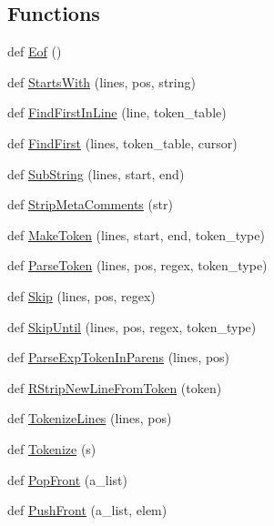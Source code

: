 \subsection*{Functions}
\begin{DoxyCompactItemize}
\item 
def \hyperlink{namespacepump_a38844b22bd5a51c098b07c2c36c5c5b3}{Eof} ()
\item 
def \hyperlink{namespacepump_a9353db466a97e632058887a77c3b26aa}{Starts\+With} (lines, pos, string)
\item 
def \hyperlink{namespacepump_af9f92ec64fe45399c7e051115a107ee7}{Find\+First\+In\+Line} (line, token\+\_\+table)
\item 
def \hyperlink{namespacepump_a08f2d05c192d11a134c008287bafef07}{Find\+First} (lines, token\+\_\+table, cursor)
\item 
def \hyperlink{namespacepump_a859edb180cfc24c24fabcfb4f2bedf9e}{Sub\+String} (lines, start, end)
\item 
def \hyperlink{namespacepump_a8c50cb40d65f26771c6f51eb265bb569}{Strip\+Meta\+Comments} (str)
\item 
def \hyperlink{namespacepump_af96d60dc97b160f3a18e63857aabeef7}{Make\+Token} (lines, start, end, token\+\_\+type)
\item 
def \hyperlink{namespacepump_a23761d99dd43d642e94d845218573035}{Parse\+Token} (lines, pos, regex, token\+\_\+type)
\item 
def \hyperlink{namespacepump_a869bd8932d9ee97f3a0e789abd05d590}{Skip} (lines, pos, regex)
\item 
def \hyperlink{namespacepump_a8935d04d89047866b07c59845e2d7d29}{Skip\+Until} (lines, pos, regex, token\+\_\+type)
\item 
def \hyperlink{namespacepump_ae094486db14ecec9347129c5f230042d}{Parse\+Exp\+Token\+In\+Parens} (lines, pos)
\item 
def \hyperlink{namespacepump_ae07150d94399cbe1661abe5929f921e0}{R\+Strip\+New\+Line\+From\+Token} (token)
\item 
def \hyperlink{namespacepump_aa383d59e8e2a9507a576fd4c6b68b6b7}{Tokenize\+Lines} (lines, pos)
\item 
def \hyperlink{namespacepump_aa42c23b1c914c0f86a94f2fa32999905}{Tokenize} (s)
\item 
def \hyperlink{namespacepump_a8e2ff118da88397e88ccf68ebcd2df79}{Pop\+Front} (a\+\_\+list)
\item 
def \hyperlink{namespacepump_a12c70577eb727526ac0ad17bf3b6c3a4}{Push\+Front} (a\+\_\+list, elem)
\item 

\end{DoxyCompactItemize}
